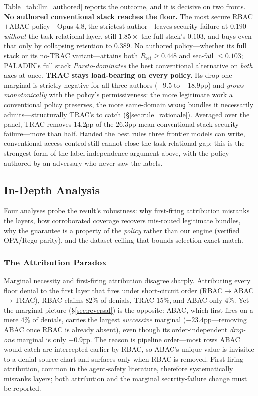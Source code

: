 \documentclass[sigconf,review,anonymous]{acmart}
\begin{document}
Table~\ref{tab:llm_authored} reports the outcome, and it is decisive on two fronts. \textbf{No authored conventional stack reaches the floor.} The most secure RBAC$+$ABAC policy---Opus 4.8, the strictest author---leaves security-failure at $0.190$ \emph{without} the task-relational layer, still $1.85\times$ the full stack's $0.103$, and buys even that only by collapsing retention to $0.389$. No authored policy---whether its full stack or its no-TRAC variant---attains both $R_{\text{ret}}\!\geq\!0.448$ and sec-fail $\leq\!0.103$; PALADIN's full stack \emph{Pareto-dominates} the best conventional alternative on \emph{both} axes at once. \textbf{TRAC stays load-bearing on every policy.} Its drop-one marginal is strictly negative for all three authors ($-9.5$ to $-18.9$pp) and \emph{grows monotonically} with the policy's permissiveness: the more legitimate work a conventional policy preserves, the more same-domain \texttt{wrong} bundles it necessarily admits---structurally TRAC's to catch (\S\ref{sec:rule_rationale}). Averaged over the panel, TRAC removes $14.2$pp of the $26.3$pp mean conventional-stack security-failure---more than half. Handed the best rules three frontier models can write, conventional access control still cannot close the task-relational gap; this is the strongest form of the label-independence argument above, with the policy authored by an adversary who never saw the labels.


\subsection{In-Depth Analysis}
\label{sec:indepth}

Four analyses probe the result's robustness: why first-firing attribution misranks the layers, how corroborated coverage recovers mis-routed legitimate bundles, why the guarantee is a property of the \emph{policy} rather than our engine (verified OPA/Rego parity), and the dataset ceiling that bounds selection exact-match.

\subsubsection{The Attribution Paradox}
\label{sec:per_domain}
\label{sec:attribution_paradox}

Marginal necessity and first-firing attribution disagree sharply. Attributing every floor denial to the first layer that fires under short-circuit order (RBAC$\to$ABAC$\to$TRAC), RBAC claims $82\%$ of denials, TRAC $15\%$, and ABAC only $4\%$. Yet the marginal picture (\S\ref{sec:reversal}) is the opposite: ABAC, which first-fires on a mere $4\%$ of denials, carries the largest \emph{successive} marginal ($-23.4$pp---removing ABAC once RBAC is already absent), even though its order-independent \emph{drop-one} marginal is only $-0.9$pp. The reason is pipeline order---most rows ABAC would catch are intercepted earlier by RBAC, so ABAC's unique value is invisible to a denial-source chart and surfaces only when RBAC is removed. First-firing attribution, common in the agent-safety literature, therefore systematically misranks layers; both attribution and the marginal security-failure change must be reported.
\end{document}
